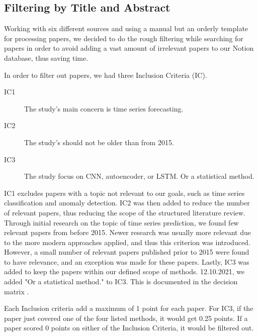\subsection{Filtering by Title and Abstract}
Working with six different sources and using a manual but an orderly template for processing papers,
we decided to do the rough filtering while searching for papers in order to avoid adding a vast amount of irrelevant
papers to our Notion database, thus saving time.

In order to filter out papers, we had three Inclusion Criteria (IC).
\begin{description}
  \item[IC1] The study's main concern is time series forecasting.
  \item[IC2] The study's should not be older than from 2015.
  \item[IC3] The study focus on CNN, autoencoder, or LSTM. Or a statistical method.
\end{description}
IC1 excludes papers with a topic not relevant to our goals, such as time series classification and anomaly detection.
IC2 was then added to reduce the number of relevant papers, thus reducing the scope of the structured literature review.
Through initial research on the topic of time series prediction, we found few relevant papers from before 2015.
Newer research was usually more relevant due to the more modern approaches applied, and thus this criterion was introduced.
However, a small number of relevant papers published prior to 2015 were found to have relevance, and an exception was made for these papers.
Lastly, IC3 was added to keep the papers within our defined scope of methods. 12.10.2021, we added "Or a statistical method."
to IC3. This is documented in the decision matrix \citep{decisionmatrix}.

Each Inclusion criteria add a maximum of 1 point for each paper. For IC3, if the paper just covered one of the
four listed methods, it would get 0.25 points. If a paper scored 0 points on either of the Inclusion Criteria, it would be filtered out.

